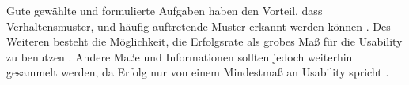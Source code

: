 Gute gewählte und formulierte Aufgaben haben den Vorteil, dass Verhaltensmuster, und häufig
auftretende Muster erkannt werden können \parencite{barnumUsabilityTesting2021}. Des Weiteren
besteht die Möglichkeit, die Erfolgsrate als grobes Maß für die Usability zu benutzen
\parencite{nielsenSuccessRate2001}. Andere Maße und Informationen sollten jedoch weiterhin gesammelt
werden, da Erfolg nur von einem Mindestmaß an Usability spricht \parencite{nielsenSuccessRate2001}.
